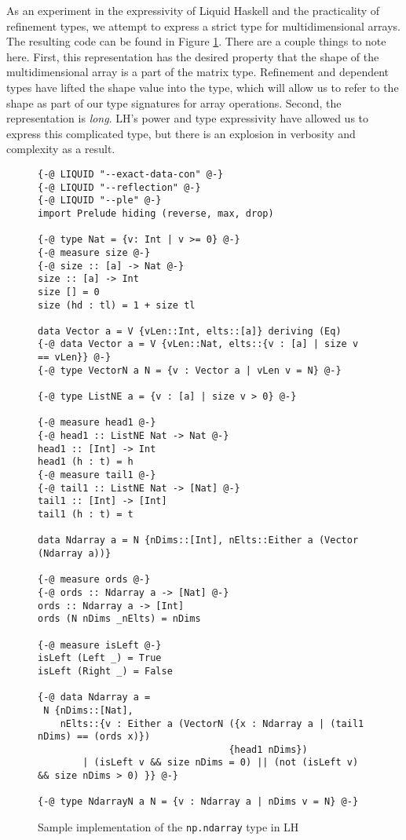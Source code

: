 \documentclass{report}
\begin{document}
As an experiment in the expressivity of Liquid Haskell and the practicality of refinement types, we attempt to express a strict type for multidimensional arrays. The resulting code can be found in Figure \ref{lh-nparray}. There are a couple things to note here. First, this representation has the desired property that the shape of the multidimensional array is a part of the matrix type. Refinement and dependent types have lifted the shape value into the type, which will allow us to refer to the shape as part of our type signatures for array operations. Second, the representation is \textit{long}. LH's power and type expressivity have allowed us to express this complicated type, but there is an explosion in verbosity and complexity as a result.

\begin{figure}
    \centering
    \begin{verbatim}
{-@ LIQUID "--exact-data-con" @-}
{-@ LIQUID "--reflection" @-}
{-@ LIQUID "--ple" @-}
import Prelude hiding (reverse, max, drop)

{-@ type Nat = {v: Int | v >= 0} @-}
{-@ measure size @-}
{-@ size :: [a] -> Nat @-}
size :: [a] -> Int
size [] = 0
size (hd : tl) = 1 + size tl

data Vector a = V {vLen::Int, elts::[a]} deriving (Eq)
{-@ data Vector a = V {vLen::Nat, elts::{v : [a] | size v == vLen}} @-}
{-@ type VectorN a N = {v : Vector a | vLen v = N} @-}

{-@ type ListNE a = {v : [a] | size v > 0} @-}

{-@ measure head1 @-}
{-@ head1 :: ListNE Nat -> Nat @-}
head1 :: [Int] -> Int
head1 (h : t) = h
{-@ measure tail1 @-}
{-@ tail1 :: ListNE Nat -> [Nat] @-}
tail1 :: [Int] -> [Int]
tail1 (h : t) = t

data Ndarray a = N {nDims::[Int], nElts::Either a (Vector (Ndarray a))}

{-@ measure ords @-}
{-@ ords :: Ndarray a -> [Nat] @-}
ords :: Ndarray a -> [Int]
ords (N nDims _nElts) = nDims

{-@ measure isLeft @-}
isLeft (Left _) = True
isLeft (Right _) = False

{-@ data Ndarray a =
 N {nDims::[Nat],
    nElts::{v : Either a (VectorN ({x : Ndarray a | (tail1 nDims) == (ords x)})
                                  {head1 nDims})
        | (isLeft v && size nDims = 0) || (not (isLeft v) && size nDims > 0) }} @-}

{-@ type NdarrayN a N = {v : Ndarray a | nDims v = N} @-}\end{verbatim}
    \caption{Sample implementation of the \texttt{np.ndarray} type in LH}
    \label{lh-nparray}
\end{figure}
\end{document}
